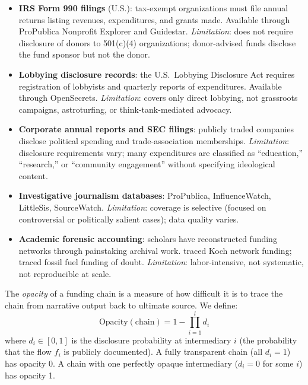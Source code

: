\begin{itemize}[nosep]
  \item \textbf{IRS Form 990 filings} (U.S.): tax-exempt organizations must file annual returns listing revenues, expenditures, and grants made.
  Available through ProPublica Nonprofit Explorer and Guidestar.
  \textit{Limitation}: does not require disclosure of donors to 501(c)(4) organizations; donor-advised funds disclose the fund sponsor but not the donor.

  \item \textbf{Lobbying disclosure records}: the U.S.\ Lobbying Disclosure Act requires registration of lobbyists and quarterly reports of expenditures.
  Available through OpenSecrets.
  \textit{Limitation}: covers only direct lobbying, not grassroots campaigns, astroturfing, or think-tank-mediated advocacy.

  \item \textbf{Corporate annual reports and SEC filings}: publicly traded companies disclose political spending and trade-association memberships.
  \textit{Limitation}: disclosure requirements vary; many expenditures are classified as ``education,'' ``research,'' or ``community engagement'' without specifying ideological content.

  \item \textbf{Investigative journalism databases}: ProPublica, InfluenceWatch, LittleSis, SourceWatch.
  \textit{Limitation}: coverage is selective (focused on controversial or politically salient cases); data quality varies.

  \item \textbf{Academic forensic accounting}: scholars have reconstructed funding networks through painstaking archival work.
  \textcite{mayer2016} traced Koch network funding; \textcite{oreskes2010} traced fossil fuel funding of doubt.
  \textit{Limitation}: labor-intensive, not systematic, not reproducible at scale.
\end{itemize}

\begin{definition}
\label{def:opacity}
The \emph{opacity} of a funding chain is a measure of how difficult it is to trace the chain from narrative output back to ultimate source.
We define:
\[
  \text{Opacity}(\text{chain}) = 1 - \prod_{i=1}^{l} d_i
\]
where $d_i \in [0,1]$ is the disclosure probability at intermediary $i$ (the probability that the flow $f_i$ is publicly documented).
A fully transparent chain (all $d_i = 1$) has opacity 0.
A chain with one perfectly opaque intermediary ($d_i = 0$ for some $i$) has opacity 1.
\end{definition}

